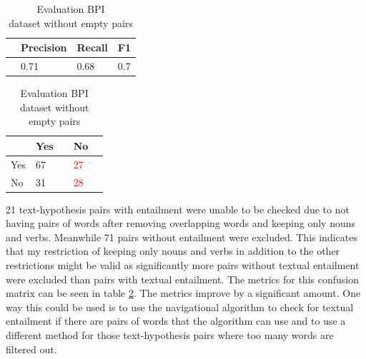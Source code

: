 \begin{table}[!htb]
    \begin{minipage}{.5\linewidth}
        \caption{Confusion matrix, BPI\\ dataset without empty pairs}
        \label{table:bpi-matrix-non-empty}
        \begin{tabular}{llll}
             & Precision & Recall & F1 \\ \hline
             & 0.71 & 0.68 & 0.7 \\
        \end{tabular}
    \end{minipage}%
    \begin{minipage}{.5\linewidth}
        \centering
        \caption{Evaluation BPI\\ dataset without empty pairs}
        \label{table:bpi-eval-non-empty}
        \begin{tabular}{l|llll}
            & Yes &  & No &  \\ \hline
            Yes & 67 &  & \textcolor{red}{27} &  \\
            No & 31 &  & \textcolor{red}{28} & 
        \end{tabular}
    \end{minipage} 
\end{table}
21 text-hypothesis pairs with entailment were unable to be checked due to not having pairs of words after removing overlapping words and keeping only nouns and verbs. Meanwhile 71 pairs without entailment were excluded. This indicates that my restriction of keeping only nouns and verbs in addition to the other restrictions might be valid as significantly more pairs without textual entailment were excluded than pairs with textual entailment. The metrics for this confusion matrix can be seen in table \ref{table:bpi-eval-non-empty}.
The metrics improve by a significant amount. One way this could be used is to use the navigational algorithm to check for textual entailment if there are pairs of words that the algorithm can use and to use a different method for those text-hypothesis pairs where too many words are filtered out.

